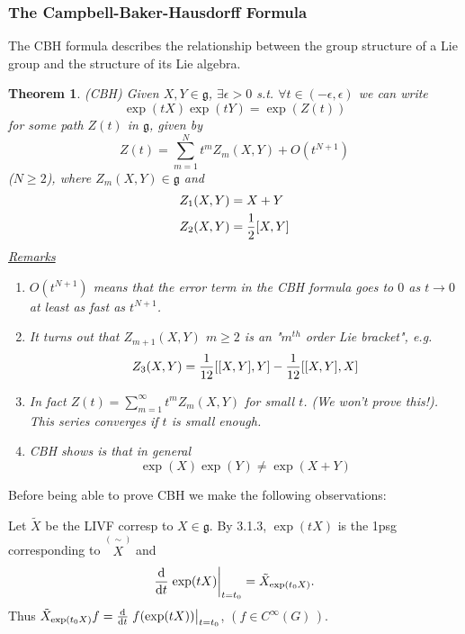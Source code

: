 \documentclass[12pt,a4paper]{article}
\newcommand{\cinfn}[1]{\ensuremath{C^{\infty}(#1)\,}}
\newcommand{\lalg}{\ensuremath{\mathfrak{g}}}
\newcommand{\ul}[1]{\underline{#1}}
\newtheorem{thm}{Theorem}[subsubsection]
\begin{document}
\subsubsection{The Campbell-Baker-Hausdorff Formula}
The CBH formula describes the relationship between the group structure of a Lie group and the structure of its Lie algebra.

\begin{thm}
(CBH) Given $X,Y\in \lalg$, $\exists \epsilon>0$ s.t. $\forall t\in (-\epsilon,\epsilon)$ we can write 
\[\exp(tX)\exp(tY)=\exp(Z(t))\]
for some path $Z(t)$ in $\lalg$, given by 
\[Z(t)=\sum_{m=1}^{N}t^m Z_m(X,Y)+O(t^{N+1})\]
($N\geq 2$), where $Z_m(X,Y)\in \lalg$ and
\begin{align*}
Z_1(X,Y)&=X+Y\\
Z_2(X,Y)&=\frac{1}{2}\comm{X}{Y}
\end{align*}
\ul{Remarks}
\begin{enumerate}
\item $O(t^{N+1})$ means that the error term in the CBH formula goes to $0$ as $t\to 0$ at least as fast as $t^{N+1}$.
\item It turns out that $Z_{m+1}(X,Y)$ $m\geq 2$ is an "$m^{th}$ order Lie bracket", e.g. 
\[Z_3(X,Y)=\frac{1}{12}\comm{\comm{X}{Y}}{Y}-\frac{1}{12}\comm{\comm{X}{Y}}{X}\]
\item In fact $Z(t)=\sum_{m=1}^{\infty}t^m Z_m(X,Y)$ for small $t$. (We won't prove this!). This series converges if $t$ is small enough.
\item CBH shows is that in general
\[\exp(X)\exp(Y)\neq \exp(X+Y)\]
\end{enumerate}
\end{thm}
Before being able to prove CBH we make the following observations:

Let $\tilde{X}$ be the LIVF corresp to $X\in \lalg$. By 3.1.3, $\exp(tX)$ is the 1psg corresponding to $\overset{(\sim)}{X}$ and 
\[\dv{t}\eval{\exp(tX)}_{t=t_0}=\tilde{X}_{\exp(t_0 X)}.\]
Thus $\tilde{X}_{\exp(t_0 X)}f=\dv{t}\eval{f(\exp(tX))}_{t=t_0}$, $(f\in \cinfn{G})$.
\end{document}
